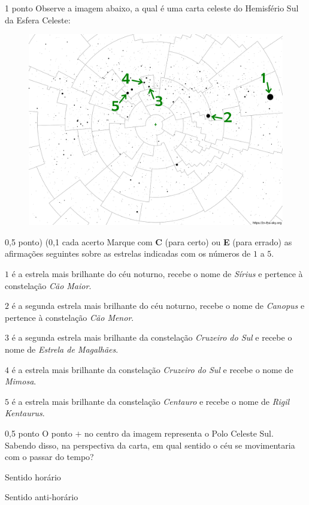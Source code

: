 \documentclass{../lista}
\begin{document}
	\begin{questao}{1 ponto}
		Observe a imagem abaixo, a qual é uma carta celeste do Hemisfério Sul da Esfera Celeste:
		\begin{figure}[H]
			\centering
			\includegraphics[scale=0.5]{./img/2.png}
		\end{figure}

		\begin{pergunta}{0,5 ponto) (0,1 cada acerto}
			Marque com \textbf{C} (para certo) ou \textbf{E} (para errado) as afirmações seguintes sobre as estrelas indicadas com os números de $1$ a $5$.
			\begin{alternativas}
				\item $1$ é a estrela mais brilhante do céu noturno, recebe o nome de \textit{Sírius} e pertence à constelação \textit{Cão Maior}.
				\item $2$ é a segunda estrela mais brilhante do céu noturno, recebe o nome de \textit{Canopus} e pertence à constelação \textit{Cão Menor}.
				\item $3$ é a segunda estrela mais brilhante da constelação \textit{Cruzeiro do Sul} e recebe o nome de \textit{Estrela de Magalhães}.
				\item $4$ é a estrela mais brilhante da constelação \textit{Cruzeiro do Sul} e recebe o nome de \textit{Mimosa}.
				\item $5$ é a estrela mais brilhante da constelação \textit{Centauro} e recebe o nome de \textit{Rigil Kentaurus}.
			\end{alternativas}
		\end{pergunta}

		\begin{pergunta}{0,5 ponto}
			O ponto $+$ no centro da imagem representa o Polo Celeste Sul. Sabendo disso, na perspectiva da carta, em qual sentido o céu se movimentaria com o passar do tempo?
			\begin{multicols}{2} \begin{alternativas}
				\item Sentido horário
				\item Sentido anti-horário
			\end{alternativas} \end{multicols}
		\end{pergunta}
	\end{questao}
\end{document}
